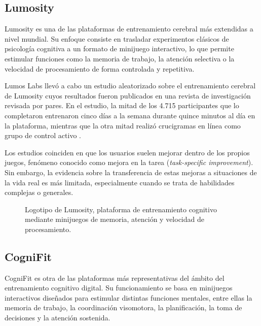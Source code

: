 \documentclass[12pt, a4paper]{report}
\begin{document}
\subsection{Lumosity}

Lumosity es una de las plataformas de entrenamiento cerebral más extendidas a
nivel mundial. Su enfoque consiste en trasladar experimentos clásicos de
psicología cognitiva a un formato de minijuego interactivo, lo que permite
estimular funciones como la memoria de trabajo, la atención selectiva o la
velocidad de procesamiento de forma controlada y repetitiva.

Lumos Labs llevó a cabo un estudio aleatorizado sobre el entrenamiento cerebral
de Lumosity cuyos resultados fueron publicados en una revista de investigación
revisada por pares. En el estudio, la mitad de los 4.715 participantes que lo
completaron entrenaron cinco días a la semana durante quince minutos al día en
la plataforma, mientras que la otra mitad realizó crucigramas en línea como
grupo de control activo \citep{LumosityWeb}.

Los estudios coinciden en que los usuarios suelen mejorar dentro de los propios
juegos, fenómeno conocido como mejora en la tarea (\textit{task-specific
improvement}). Sin embargo, la evidencia sobre la transferencia de estas mejoras
a situaciones de la vida real es más limitada, especialmente cuando se trata de
habilidades complejas o generales.

\begin{figure}[H]
  \centering
  \caption{Logotipo de Lumosity, plataforma de entrenamiento cognitivo
    mediante minijuegos de memoria, atención y velocidad de procesamiento.}
  \label{fig:lumosity}
\end{figure}

\subsection{CogniFit}

CogniFit es otra de las plataformas más representativas del ámbito del
entrenamiento cognitivo digital. Su funcionamiento se basa en minijuegos
interactivos diseñados para estimular distintas funciones mentales, entre
ellas la memoria de trabajo, la coordinación visomotora, la planificación, la
toma de decisiones y la atención sostenida.
\end{document}

